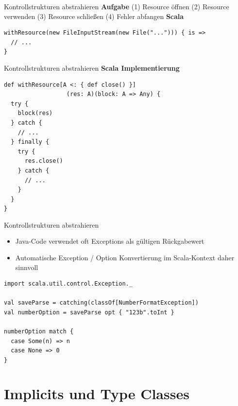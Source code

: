 \documentclass{beamer}
\begin{document}

\begin{frame}[fragile]{Kontrollstrukturen abstrahieren}
\center \textbf{Aufgabe} \linebreak	
(1) Resource öffnen (2) Resource verwenden \linebreak (3) Resource schließen (4) Fehler abfangen
\center \textbf{Scala}
\begin{lstlisting}
withResource(new FileInputStream(new File("..."))) { is =>
  // ...
}
\end{lstlisting}
\end{frame}  


\begin{frame}[fragile]{Kontrollstrukturen abstrahieren}
\center \textbf{Scala Implementierung}
\begin{lstlisting}
def withResource[A <: { def close() }]
                  (res: A)(block: A => Any) {
  try {
    block(res)
  } catch {
    // ...
  } finally {
    try {
      res.close()
    } catch {
      // ...
    }
  }
}
\end{lstlisting}
\end{frame}  


\begin{frame}[fragile]{Kontrollstrukturen abstrahieren}
\begin{itemize}
	\item Java-Code verwendet oft Exceptions als gültigen Rückgabewert
	\item Automatische Exception / Option Konvertierung im Scala-Kontext daher sinnvoll
\end{itemize}
\begin{lstlisting}
import scala.util.control.Exception._

val saveParse = catching(classOf[NumberFormatException])
val numberOption = saveParse opt { "123b".toInt }   

numberOption match {
  case Some(n) => n
  case None => 0
}
\end{lstlisting}
\end{frame}  


\section{Implicits und Type Classes}
\end{document}
